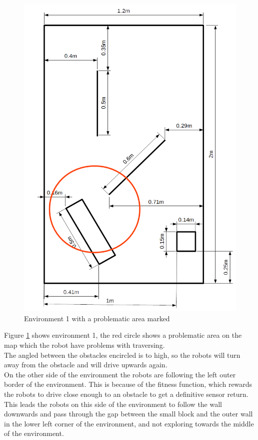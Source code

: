 \begin{figure}[h]
\centering
\includegraphics[scale=0.4]{Chapter4/images/environment_marked1}
\caption{Environment 1 with a problematic area marked}
\label{fig:enviro_marked1}
\end{figure}

Figure \ref{fig:enviro_marked1} shows environment 1, the red circle shows a  problematic area on the map which the robot have problems with traversing.\\
The angled between the obstacles encircled is to high, so the robots will turn away from the obstacle and will drive upwards again. \\
On the other side of the environment the robots are following the left outer border of the environment. This is because of the fitness function, which rewards the robots to drive close enough to an obstacle to get a definitive sensor return. 
This leads the robots on this side of the environment to follow the wall downwards and pass through the gap between the small block and the outer wall in the lower left corner of the environment, and not exploring towards the middle of the environment.\\


